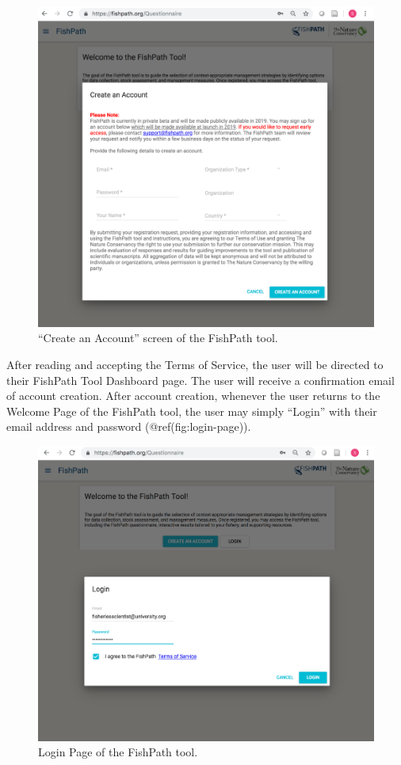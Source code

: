 \documentclass[11pt,]{book}
\begin{document}
\begin{figure}

{\centering \includegraphics[width=0.95\linewidth]{images/create-account} 

}

\caption{“Create an Account” screen of the FishPath tool.}\label{fig:create-account}
\end{figure}

After reading and accepting the Terms of Service, the user will be
directed to their FishPath Tool Dashboard page. The user will receive a
confirmation email of account creation. After account creation, whenever
the user returns to the Welcome Page of the FishPath tool, the user may
simply ``Login'' with their email address and password
(@ref(fig:login-page)).

\begin{figure}

{\centering \includegraphics[width=0.95\linewidth]{images/login-page} 

}

\caption{Login Page of the FishPath tool.}\label{fig:login-page}
\end{figure}
\end{document}
